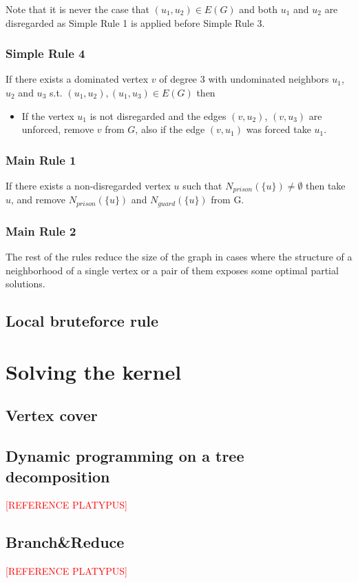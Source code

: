 \documentclass[a4paper,UKenglish,cleveref, autoref, thm-restate]{lipics-v2021}
\begin{document}
Note that it is never the case that $(u_1, u_2) \in E(G)$ and both $u_1$ and $u_2$ are disregarded as Simple Rule 1 is applied before Simple Rule 3.

\subsubsection{Simple Rule 4}
If there exists a dominated vertex $v$ of degree 3 with undominated neighbors $u_1$, $u_2$ and $u_3$ s.t. $(u_1, u_2), (u_1, u_3) \in E(G)$ then
\begin{itemize}
    \item If the vertex $u_1$ is not disregarded and the edges $(v, u_2)$, $(v, u_3)$ are unforced, remove $v$ from $G$, also if the edge $(v, u_1)$ was forced take $u_1$.
\end{itemize}


\subsubsection{Main Rule 1}
If there exists a non-disregarded vertex $u$ such that $N_{prison}(\{u\}) \neq \emptyset$ then take $u$, and remove $N_{prison}(\{u\})$ and $N_{guard}{(\{u\})}$ from G.

\subsubsection{Main Rule 2}


The rest of the rules reduce the size of the graph in cases where the structure of a neighborhood of a single vertex or a pair of them exposes some optimal partial solutions.


\subsection{Local bruteforce rule}

\section{Solving the kernel}
\subsection{Vertex cover}
\subsection{Dynamic programming on a tree decomposition}
\textcolor{red}{[REFERENCE PLATYPUS]}
\subsection{Branch\&Reduce}
\textcolor{red}{[REFERENCE PLATYPUS]}





\appendix
\end{document}
